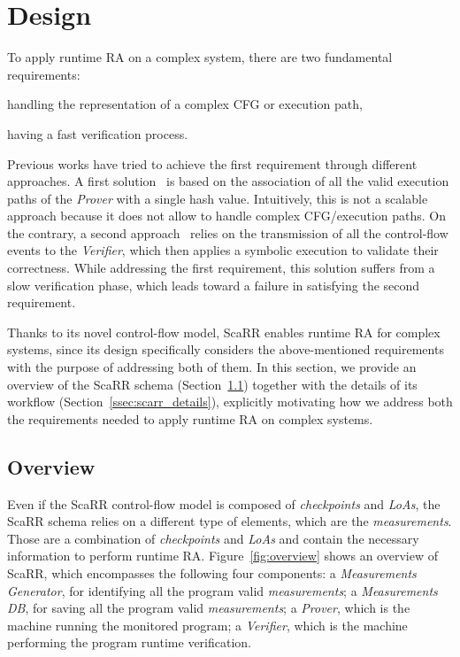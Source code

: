 \section{Design}
\label{sec:proposal}

To apply runtime RA on a complex system, there are two fundamental 
requirements: 
\begin{enumerate*}[label=(\roman*)]
	\item handling the representation of a complex CFG or execution path,
	\item having a fast verification process.
\end{enumerate*}
Previous works have tried to achieve the first requirement through different 
approaches. A first 
solution~\cite{abera2016c,zeitouni2017atrium,dessouky2017fat} is based on the 
association of all the valid execution paths of the \emph{Prover} with a single 
hash value. 
Intuitively, this is not a scalable approach because it does not allow to 
handle complex CFG/execution paths. 
On the contrary, a second approach~\cite{Dessouky:2018:LLH:3240765.3240821} 
relies on the transmission of all the control-flow events to the 
\emph{Verifier}, 
which then applies a symbolic execution to validate their correctness. While 
addressing the first requirement, this solution suffers from a slow 
verification phase, which leads toward a failure in satisfying the second 
requirement. 

Thanks to its novel control-flow model, ScaRR enables runtime RA for complex 
systems, since its design specifically considers the above-mentioned 
requirements with the purpose of addressing both of them. In this section, we 
provide an overview of the ScaRR schema (Section~\ref{ssec:scarr_overview}) 
together with the details of its workflow (Section~\ref{ssec:scarr_details}), 
explicitly motivating how we address both the requirements needed to apply 
runtime RA on complex systems. 

\subsection{Overview}
\label{ssec:scarr_overview}
Even if the ScaRR control-flow model is composed of \emph{checkpoints} and 
\emph{LoAs}, the ScaRR schema relies on a different type of elements, which are 
the \emph{measurements}. Those are a combination of \emph{checkpoints} and 
\emph{LoAs} and contain the necessary information to perform runtime RA. 
Figure~\ref{fig:overview} shows an overview of ScaRR, which encompasses the 
following four components: a \emph{Measurements Generator}, for identifying all 
the program valid \emph{measurements}; 
a \emph{Measurements DB}, for saving all the program valid \emph{measurements};
a \emph{Prover}, which is the machine running the monitored program;
a \emph{Verifier}, which is the machine performing the program runtime 
verification. 

